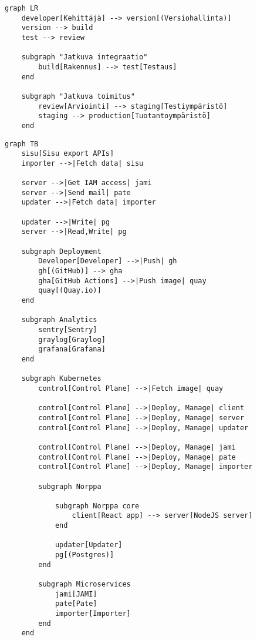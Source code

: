 
\begin{lstlisting}[title=Kuva \ref{fig:cicd}, captionpos=b]
graph LR
    developer[Kehittäjä] --> version[(Versiohallinta)]
    version --> build
    test --> review

    subgraph "Jatkuva integraatio"
        build[Rakennus] --> test[Testaus]
    end

    subgraph "Jatkuva toimitus"
        review[Arviointi] --> staging[Testiympäristö]
        staging --> production[Tuotantoympäristö]
    end
\end{lstlisting}

\begin{lstlisting}[title=Kuva \ref{fig:norppa}, captionpos=b]
graph TB
    sisu[Sisu export APIs]
    importer -->|Fetch data| sisu

    server -->|Get IAM access| jami
    server -->|Send mail| pate
    updater -->|Fetch data| importer

    updater -->|Write| pg
    server -->|Read,Write| pg

    subgraph Deployment
        Developer[Developer] -->|Push| gh
        gh[(GitHub)] --> gha
        gha[GitHub Actions] -->|Push image| quay
        quay[(Quay.io)]
    end

    subgraph Analytics
        sentry[Sentry]
        graylog[Graylog]
        grafana[Grafana]
    end

    subgraph Kubernetes
        control[Control Plane] -->|Fetch image| quay

        control[Control Plane] -->|Deploy, Manage| client
        control[Control Plane] -->|Deploy, Manage| server
        control[Control Plane] -->|Deploy, Manage| updater

        control[Control Plane] -->|Deploy, Manage| jami
        control[Control Plane] -->|Deploy, Manage| pate
        control[Control Plane] -->|Deploy, Manage| importer

        subgraph Norppa

            subgraph Norppa core
                client[React app] --> server[NodeJS server]
            end

            updater[Updater]
            pg[(Postgres)]
        end

        subgraph Microservices
            jami[JAMI]
            pate[Pate]
            importer[Importer]
        end
    end
\end{lstlisting}
